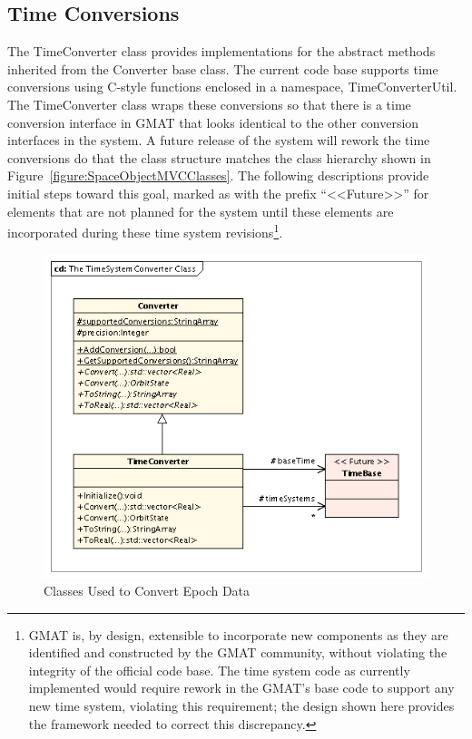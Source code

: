 \subsection{Time Conversions}

The TimeConverter class provides implementations for the abstract methods inherited from the
Converter base class.  The current code base supports time conversions using C-style functions
enclosed in a namespace, TimeConverterUtil.  The TimeConverter class wraps these conversions so
that there is a time conversion interface in GMAT that looks identical to the other conversion
interfaces in the system.  A future release of the system will rework the time conversions do that
the class structure matches the class hierarchy shown in Figure~\ref{figure:SpaceObjectMVCClasses}.
 The following descriptions provide initial steps toward this goal, marked as with the prefix
``<<Future>>'' for elements that are not planned for the system until these elements are
incorporated during these time system revisions\footnote{GMAT is, by design, extensible to
incorporate new components as they are identified and constructed by the GMAT community, without
violating the integrity of the official code base. The time system code as currently implemented
would require rework in the GMAT's base code to support any new time system, violating this
requirement; the design shown here provides the framework needed to correct this discrepancy.}.

\begin{figure}[htb]
\begin{center}
\includegraphics[260,219]{Images/TheTimeSystemConverterClass.png}
\caption{\label{figure:TimeConverterClasses}Classes Used to Convert Epoch Data}
\end{center}
\end{figure}

